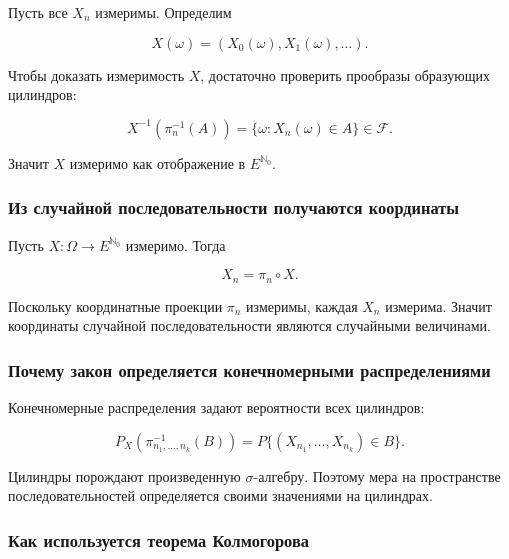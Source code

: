 \documentclass[
  11pt,
  a4paper,
]{article}
\begin{document}
Пусть все \(X_n\) измеримы. Определим

\[
X(\omega)=(X_0(\omega),X_1(\omega),\ldots).
\]

Чтобы доказать измеримость \(X\), достаточно проверить прообразы
образующих цилиндров:

\[
X^{-1}(\pi_n^{-1}(A))
=
\{\omega:X_n(\omega)\in A\}
\in\mathcal F.
\]

Значит \(X\) измеримо как отображение в \(E^{\mathbb N_0}\).

\subsubsection{Из случайной последовательности получаются
координаты}\label{ux438ux437-ux441ux43bux443ux447ux430ux439ux43dux43eux439-ux43fux43eux441ux43bux435ux434ux43eux432ux430ux442ux435ux43bux44cux43dux43eux441ux442ux438-ux43fux43eux43bux443ux447ux430ux44eux442ux441ux44f-ux43aux43eux43eux440ux434ux438ux43dux430ux442ux44b}

Пусть \(X:\Omega\to E^{\mathbb N_0}\) измеримо. Тогда

\[
X_n=\pi_n\circ X.
\]

Поскольку координатные проекции \(\pi_n\) измеримы, каждая \(X_n\)
измерима. Значит координаты случайной последовательности являются
случайными величинами.

\subsubsection{Почему закон определяется конечномерными
распределениями}\label{ux43fux43eux447ux435ux43cux443-ux437ux430ux43aux43eux43d-ux43eux43fux440ux435ux434ux435ux43bux44fux435ux442ux441ux44f-ux43aux43eux43dux435ux447ux43dux43eux43cux435ux440ux43dux44bux43cux438-ux440ux430ux441ux43fux440ux435ux434ux435ux43bux435ux43dux438ux44fux43cux438}

Конечномерные распределения задают вероятности всех цилиндров:

\[
P_X(\pi_{n_1,\ldots,n_k}^{-1}(B))
=
P\{(X_{n_1},\ldots,X_{n_k})\in B\}.
\]

Цилиндры порождают произведенную \(\sigma\)-алгебру. Поэтому мера на
пространстве последовательностей определяется своими значениями на
цилиндрах.

\subsubsection{Как используется теорема
Колмогорова}\label{ux43aux430ux43a-ux438ux441ux43fux43eux43bux44cux437ux443ux435ux442ux441ux44f-ux442ux435ux43eux440ux435ux43cux430-ux43aux43eux43bux43cux43eux433ux43eux440ux43eux432ux430}
\end{document}
